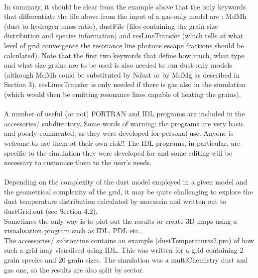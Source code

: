 \documentclass[11pt]{article}
\begin{document}
\\
   In summary, it should be clear from the example above that the only keywords that 
   differentiate the file above from the input of a gas-only model are :
   MdMh (dust to hydrogen mass ratio), dustFile (files containing the grain size 
   distribution and species information) and resLineTransfer (which tells at what level
   of grid convergence the resonance line photons escape fractions should be calculated). 
   Note that the first two keywords that define how much, what type and what size 
   grains are to be used is also needed to run dust-only models (although MdMh could be 
   substituted by Ndust or by MdMg as described in Section 3). resLinesTransfer is 
   only needed if there is gas also in the simulation (which would then be emitting 
   resonance lines capable of heating the grains).\\
   
\\
   A number of useful (or not) FORTRAN and IDL programs are included in the accessories/
   subdirectory. Some words of warning: the programs are very basic and poorly 
   commented, as they were developed for personal use. Anyone is welcome to use 
   them at their own risk!! The IDL programs, in particular, are specific to the 
   simulation they were developed for and some editing will be necessary to 
   customise them to the user's needs.\\

\\
   Depending on the complexity of the dust model employed in a given model and the 
   geometrical complexity of the grid, it may be quite challenging to explore the 
   dust temperature distribution calculated by mocassin and written out to 
   dustGrid.out (see Section 4.2). \\
   Sometimes the only way is to plot out the results or create 3D maps using a 
   visualisation program such as IDL, PDL etc.. \\
   The accessories/ subroutine contains an example (dustTemperatures2.pro) of 
   how such a grid may visualised using IDL. This was written for a grid containing 
   2 grain species and 20 grain sizes. The simulation was a multiChemistry dust 
   and gas one, so the results are also split by sector. \\

\pagebreak

\\
\end{document}
